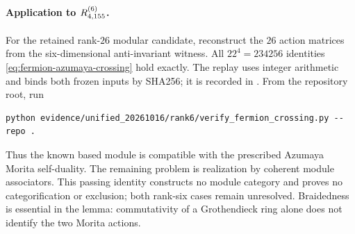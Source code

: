 \paragraph{Application to $R^{(6)}_{4,155}$.}
For the retained rank-$26$ modular candidate, reconstruct the $26$
action matrices from the six-dimensional
anti-invariant witness.  All $22^4=234256$ identities
\eqref{eq:fermion-azumaya-crossing} hold exactly.  The replay uses integer
arithmetic and binds both frozen inputs by SHA256; it is recorded in
.
From the repository root, run
\begin{verbatim}
python evidence/unified_20261016/rank6/verify_fermion_crossing.py --repo .
\end{verbatim}
Thus the known based module is compatible with the prescribed Azumaya
Morita self-duality.  The remaining problem is realization by coherent
module associators.  This passing identity constructs no module category
and proves no categorification or exclusion; both rank-six cases remain
unresolved.  Braidedness is essential in the lemma: commutativity of a
Grothendieck ring alone does not identify the two Morita actions.
